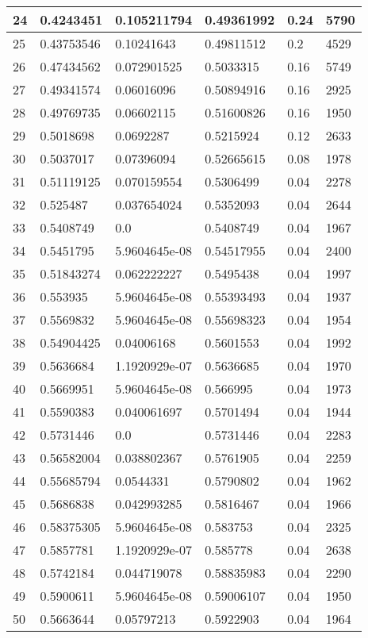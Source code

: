 \begin{longtable}{|l|l|l|l|l|l|}
24 & 0.4243451 & 0.105211794 & 0.49361992 & 0.24 & 5790 \\ \hline 
25 & 0.43753546 & 0.10241643 & 0.49811512 & 0.2 & 4529 \\ \hline 
26 & 0.47434562 & 0.072901525 & 0.5033315 & 0.16 & 5749 \\ \hline 
27 & 0.49341574 & 0.06016096 & 0.50894916 & 0.16 & 2925 \\ \hline 
28 & 0.49769735 & 0.06602115 & 0.51600826 & 0.16 & 1950 \\ \hline 
29 & 0.5018698 & 0.0692287 & 0.5215924 & 0.12 & 2633 \\ \hline 
30 & 0.5037017 & 0.07396094 & 0.52665615 & 0.08 & 1978 \\ \hline 
31 & 0.51119125 & 0.070159554 & 0.5306499 & 0.04 & 2278 \\ \hline 
32 & 0.525487 & 0.037654024 & 0.5352093 & 0.04 & 2644 \\ \hline 
33 & 0.5408749 & 0.0 & 0.5408749 & 0.04 & 1967 \\ \hline 
34 & 0.5451795 & 5.9604645e-08 & 0.54517955 & 0.04 & 2400 \\ \hline 
35 & 0.51843274 & 0.062222227 & 0.5495438 & 0.04 & 1997 \\ \hline 
36 & 0.553935 & 5.9604645e-08 & 0.55393493 & 0.04 & 1937 \\ \hline 
37 & 0.5569832 & 5.9604645e-08 & 0.55698323 & 0.04 & 1954 \\ \hline 
38 & 0.54904425 & 0.04006168 & 0.5601553 & 0.04 & 1992 \\ \hline 
39 & 0.5636684 & 1.1920929e-07 & 0.5636685 & 0.04 & 1970 \\ \hline 
40 & 0.5669951 & 5.9604645e-08 & 0.566995 & 0.04 & 1973 \\ \hline 
41 & 0.5590383 & 0.040061697 & 0.5701494 & 0.04 & 1944 \\ \hline 
42 & 0.5731446 & 0.0 & 0.5731446 & 0.04 & 2283 \\ \hline 
43 & 0.56582004 & 0.038802367 & 0.5761905 & 0.04 & 2259 \\ \hline 
44 & 0.55685794 & 0.0544331 & 0.5790802 & 0.04 & 1962 \\ \hline 
45 & 0.5686838 & 0.042993285 & 0.5816467 & 0.04 & 1966 \\ \hline 
46 & 0.58375305 & 5.9604645e-08 & 0.583753 & 0.04 & 2325 \\ \hline 
47 & 0.5857781 & 1.1920929e-07 & 0.585778 & 0.04 & 2638 \\ \hline 
48 & 0.5742184 & 0.044719078 & 0.58835983 & 0.04 & 2290 \\ \hline 
49 & 0.5900611 & 5.9604645e-08 & 0.59006107 & 0.04 & 1950 \\ \hline 
50 & 0.5663644 & 0.05797213 & 0.5922903 & 0.04 & 1964 \\ \hline 
\end{longtable}